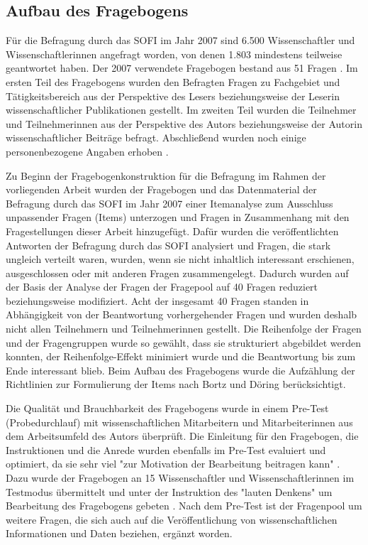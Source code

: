 \subsection{Aufbau des Fragebogens}

Für die Befragung durch das SOFI im Jahr 2007 sind 6.500 Wissenschaftler und Wissenschaftlerinnen angefragt worden, von denen 1.803 mindestens teilweise geantwortet haben. Der 2007 verwendete Fragebogen bestand aus 51 Fragen \cite{SOFI_2007}. Im ersten Teil des Fragebogens wurden den Befragten Fragen zu Fachgebiet und Tätigkeitsbereich aus der Perspektive des Lesers beziehungsweise der Leserin wissenschaftlicher Publikationen gestellt. Im zweiten Teil wurden die Teilnehmer und Teilnehmerinnen aus der Perspektive des Autors beziehungsweise der Autorin wissenschaftlicher Beiträge befragt. Abschließend wurden noch einige personenbezogene Angaben erhoben \cite{SOFI_2007}.

Zu Beginn der Fragebogenkonstruktion für die Befragung im Rahmen der vorliegenden Arbeit wurden der Fragebogen und das Datenmaterial der Befragung durch das SOFI im Jahr 2007 einer Itemanalyse zum Ausschluss unpassender Fragen (Items) unterzogen und Fragen in Zusammenhang mit den Fragestellungen dieser Arbeit hinzugefügt. Dafür wurden die veröffentlichten Antworten der Befragung durch das SOFI analysiert \cite{SOFI_2007} und Fragen, die stark ungleich verteilt waren, wurden, wenn sie nicht inhaltlich interessant erschienen, ausgeschlossen oder mit anderen Fragen zusammengelegt. Dadurch wurden auf der Basis der Analyse der Fragen der Fragepool auf 40 Fragen reduziert beziehungsweise modifiziert. Acht der insgesamt 40 Fragen standen in Abhängigkeit von der Beantwortung vorhergehender Fragen und wurden deshalb nicht allen Teilnehmern und Teilnehmerinnen gestellt. Die Reihenfolge der Fragen und der Fragengruppen wurde so gewählt, dass sie strukturiert abgebildet werden konnten, der Reihenfolge-Effekt minimiert wurde und die Beantwortung bis zum Ende interessant blieb. Beim Aufbau des Fragebogens wurde die Aufzählung der Richtlinien zur Formulierung der Items nach Bortz und Döring \cite{Bortz_2006a} berücksichtigt.

Die Qualität und Brauchbarkeit des Fragebogens wurde in einem Pre-Test (Probedurchlauf) mit wissenschaftlichen Mitarbeitern und Mitarbeiterinnen aus dem Arbeitsumfeld des Autors überprüft. Die Einleitung für den Fragebogen, die Instruktionen und die Anrede wurden ebenfalls im Pre-Test evaluiert und optimiert, da sie sehr viel "zur Motivation der Bearbeitung beitragen kann" \cite{Raab-Steiner_2012}. Dazu wurde der Fragebogen an 15 Wissenschaftler und Wissenschaftlerinnen im Testmodus übermittelt und unter der Instruktion des "lauten Denkens" um Bearbeitung des Fragebogens gebeten \cite{Raab-Steiner_2012}. Nach dem Pre-Test ist der Fragenpool um weitere Fragen, die sich auch auf die Veröffentlichung von wissenschaftlichen Informationen und Daten beziehen, ergänzt worden.

